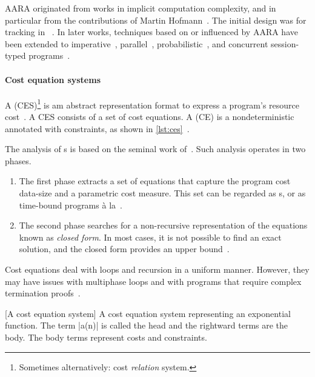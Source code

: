 AARA originated from works in implicit computation complexity, and in particular
from the contributions of Martin Hofmann~\cite{hoffmann2022}. The initial design
was for tracking  in ~\cite{hoffmann2012}. In later works, techniques based on or influenced
by AARA have been extended to imperative~\cite{carbonneaux2015,carbonneaux2017}, parallel~\cite{hoffmann2015},
probabilistic~\cite{avanzini2020,ngo2018,wang2020}, and concurrent session-typed
programs~\cite{das2018,das2021}.

\paragraph*{Cost equation systems}
A \emph{} (CES)\footnote{Sometimes alternatively: cost
\emph{relation} system.} is am abstract representation format to express a
program's resource cost~\cite{floresmontoya2017,albert2019}. A CES consists of a
set of cost equations. A \emph{} (CE) is a
nondeterministic  annotated with
constraints, as shown in \autoref{lst:ces}~\cite{floresmontoya2014}.

The analysis of s is based on the seminal work
of~\textcite{wegbreit1975}. Such analysis operates in two phases.

\begin{enumerate}
\item The first phase extracts a set of equations that capture the program cost
\wrt data-size and a parametric cost measure. This set can be regarded as
s, or as time-bound programs à
la~\textcite{rosendahl1989}.

\item The second phase searches for a non-recursive representation of the
equations known as \emph{closed form}. In most cases, it is not possible to find
an exact solution, and the closed form provides an upper
bound~\cite{albert2008}.
\end{enumerate}

Cost equations deal with loops and recursion in a uniform manner. However, they
may have issues with multiphase loops and with programs that require complex
termination proofs~\cite{floresmontoya2014}.

\begin{center}
\begin{minipage}{\textwidth}
\captionsetup{type=lstlisting}
[A cost equation system]{
A cost equation system representing an exponential function.
The term \pr|a(n)| is called the {head} and the rightward terms are the {body}.
The body terms represent costs and constraints.}
\label{lst:ces}
\end{minipage}
\end{center}

